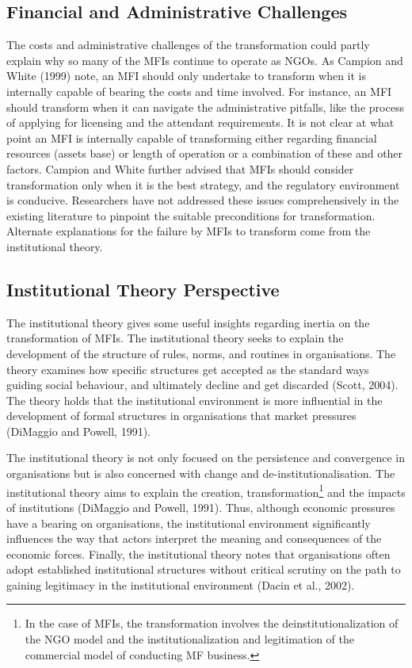 \documentclass[a4paper, nobind]{templates/ociamthesis}
\begin{document}
\hypertarget{financial-and-administrative-challenges}{%
\subsection{Financial and Administrative Challenges}\label{financial-and-administrative-challenges}}

\noindent The costs and administrative challenges of the transformation could partly explain why so many of the MFIs continue to operate as NGOs. As Campion and White (1999) note, an MFI should only undertake to transform when it is internally capable of bearing the costs and time involved. For instance, an MFI should transform when it can navigate the administrative pitfalls, like the process of applying for licensing and the attendant requirements. It is not clear at what point an MFI is internally capable of transforming either regarding financial resources (assets base) or length of operation or a combination of these and other factors. Campion and White further advised that MFIs should consider transformation only when it is the best strategy, and the regulatory environment is conducive. Researchers have not addressed these issues comprehensively in the existing literature to pinpoint the suitable preconditions for transformation. Alternate explanations for the failure by MFIs to transform come from the institutional theory.

\hypertarget{institutional-theory-perspective}{%
\subsection{Institutional Theory Perspective}\label{institutional-theory-perspective}}

\noindent The institutional theory gives some useful insights regarding inertia on the transformation of MFIs. The institutional theory seeks to explain the development of the structure of rules, norms, and routines in organisations. The theory examines how specific structures get accepted as the standard ways guiding social behaviour, and ultimately decline and get discarded (Scott, 2004). The theory holds that the institutional environment is more influential in the development of formal structures in organisations that market pressures (DiMaggio and Powell, 1991).

The institutional theory is not only focused on the persistence and convergence in organisations but is also concerned with change and de-institutionalisation. The institutional theory aims to explain the creation, transformation\footnote{In the case of MFIs, the transformation involves the deinstitutionalization of the NGO model and the institutionalization and legitimation of the commercial model of conducting MF business.} and the impacts of institutions (DiMaggio and Powell, 1991). Thus, although economic pressures have a bearing on organisations, the institutional environment significantly influences the way that actors interpret the meaning and consequences of the economic forces. Finally, the institutional theory notes that organisations often adopt established institutional structures without critical scrutiny on the path to gaining legitimacy in the institutional environment (Dacin et al., 2002).
\end{document}
